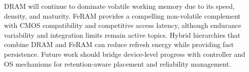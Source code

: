 DRAM will continue to dominate volatile working memory due to its speed, density, and maturity. FeRAM provides a compelling non-volatile complement with CMOS compatibility and competitive access latency, although endurance variability and integration limits remain active topics. Hybrid hierarchies that combine DRAM and FeRAM can reduce refresh energy while providing fast persistence. Future work should bridge device-level progress with controller and OS mechanisms for retention-aware placement and reliability management.
